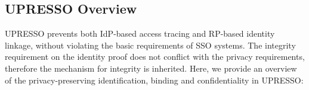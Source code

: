 \subsection{UPRESSO Overview}
\label{subsec:solutions}
UPRESSO prevents both IdP-based access tracing and RP-based identity linkage, without violating the basic requirements of SSO systems.
The integrity requirement on the identity proof  does not conflict with the privacy requirements, therefore the mechanism for integrity is inherited.
Here, we provide an overview of the privacy-preserving identification, binding and confidentiality in UPRESSO:
